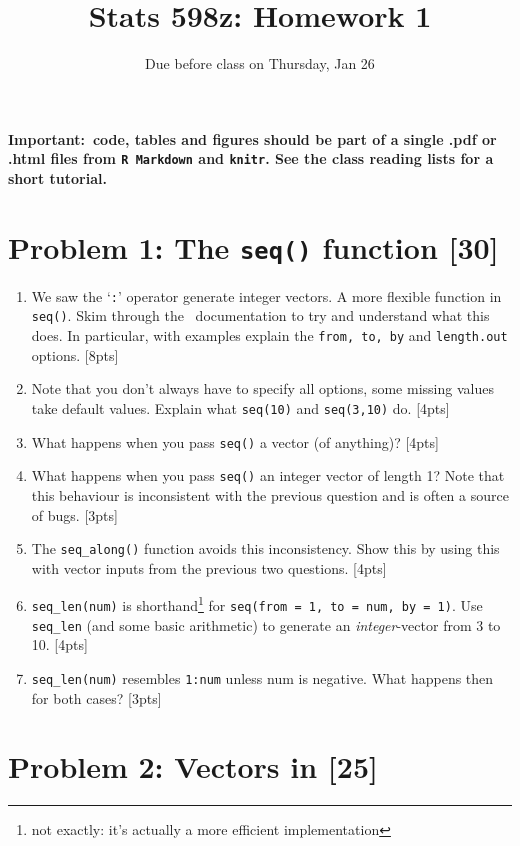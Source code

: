 \documentclass[10pt]{article}
\title{Stats 598z: Homework 1}
\author{Due before class on Thursday, Jan 26}
\date{}
\begin{document}
\maketitle
\textbf{Important:\R\ code, tables and figures should be part of a single .pdf or .html files from {\tt R Markdown} and {\tt knitr}. 
See the class reading lists for a short tutorial.}

\section{Problem 1: The {\tt seq()} function \hfill [30]}
\begin{enumerate}
  \item We saw the `{\tt :}' operator generate integer vectors. A more flexible function in {\tt seq()}. Skim through
    the \R\ documentation to try and understand what this does. In particular, with examples explain the {\tt from, to,
    by} and {\tt length.out} options. \hfill [8pts]
  \item Note that you don't always have to specify all options, some missing values take
    default values. Explain what {\tt seq(10)} and {\tt seq(3,10)} do. \hfill [4pts]
  \item What happens when you pass {\tt seq()} a vector (of anything)? \hfill [4pts]
  \item What happens when you pass {\tt seq()} an integer vector of length 1? Note that this behaviour is inconsistent with
    the previous question and is often a source of bugs. \hfill [3pts]
  \item The {\tt seq\_along()} function avoids this inconsistency. Show this by using this with vector inputs from the
    previous two questions. \hfill [4pts]
  \item {\tt seq\_len(num)} is shorthand\footnote{not exactly: it's actually a more efficient implementation} for {\tt seq(from = 1, to = num, by = 1)}. 
    Use {\tt seq\_len} (and some basic arithmetic) to generate an
    \emph{integer}-vector from 3 to 10. \hfill [4pts]
  \item {\tt seq\_len(num)} resembles {\tt 1:num} unless num is negative. What happens then for both cases? \hfill [3pts]
\end{enumerate}

\section{Problem 2: Vectors in \R\hfill  [25]} 
\end{document}

